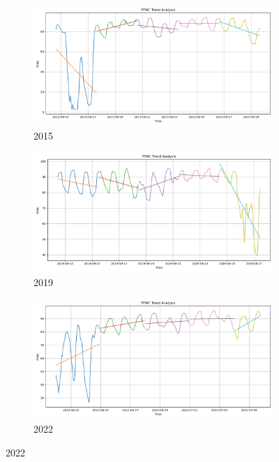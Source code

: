\begin{figure}[h]
	\centering
	\caption{All-time FFMC polyfit trend}
	\begin{subfigure}{0.3\textwidth}
		\centering
		\includegraphics[width=\textwidth]{graphs/polyfit_trend_analysis/2015_15days_BLOCK3days_ffmc_trend_analysis.png}
		\caption{2015}
		\label{fig:2015_polyfit_ffmc_alltime}
	\end{subfigure}
	\hfill
	\begin{subfigure}{0.3\textwidth}
		\centering
		\includegraphics[width=\textwidth]{graphs/polyfit_trend_analysis/2019_15days_BLOCK3days_ffmc_trend_analysis.png}
		\caption{2019}
		\label{fig:2019_polyfit_ffmc_alltime}
	\end{subfigure}
	\hfill
	\begin{subfigure}{0.3\textwidth}
		\centering
		\includegraphics[width=\textwidth]{graphs/polyfit_trend_analysis/2022_15days_BLOCK3days_ffmc_trend_analysis.png}
		\caption{2022}
		\label{fig:2022_polyfit_ffmc_alltime}
	\end{subfigure}
	
	\label{fig:ffmc_polyfit_alltime}
\end{figure}

